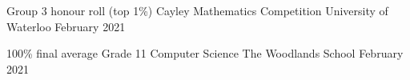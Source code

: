
\begin{cvhonors}

  \cvhonor
    {Group 3 honour roll (top 1\%)} %
    {Cayley Mathematics Competition} %
    {University of Waterloo} %
    {February 2021} %

  \cvhonor
    {100\% final average} %
    {Grade 11 Computer Science} %
    {The Woodlands School} %
    {February 2021} %

\end{cvhonors}
